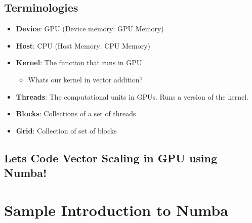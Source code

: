 \documentclass[11pt]{article}
\providecommand{\tightlist}{%
      \setlength{\itemsep}{0pt}\setlength{\parskip}{0pt}}
\begin{document}
    \subsection{Terminologies}\label{terminologies}

    \begin{itemize}
\tightlist
\item
  \textbf{Device}: GPU (Device memory: GPU Memory)
\end{itemize}

    \begin{itemize}
\tightlist
\item
  \textbf{Host}: CPU (Host Memory: CPU Memory)
\end{itemize}

    \begin{itemize}
\tightlist
\item
  \textbf{Kernel}: The function that runs in GPU

  \begin{itemize}
  \tightlist
  \item
    Whats our kernel in vector addition?
  \end{itemize}
\end{itemize}

    \begin{itemize}
\tightlist
\item
  \textbf{Threads}: The computational units in GPUs. Runs a version of
  the kernel.
\end{itemize}

    \begin{itemize}
\tightlist
\item
  \textbf{Blocks}: Collections of a set of threads
\end{itemize}

    \begin{itemize}
\tightlist
\item
  \textbf{Grid}: Collection of set of blocks
\end{itemize}

    \subsection{Lets Code Vector Scaling in GPU using
Numba!}\label{lets-code-vector-scaling-in-gpu-using-numba}

    \section{Sample Introduction to
Numba}\label{sample-introduction-to-numba}
\end{document}
